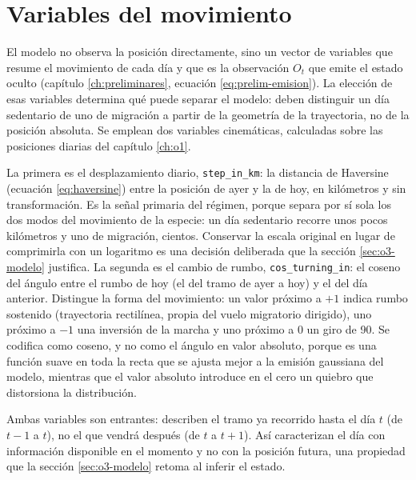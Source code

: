 \section{Variables del movimiento}
\label{sec:o3-features}

El modelo no observa la posición directamente, sino un vector de variables que resume
el movimiento de cada día y que es la observación $O_t$ que emite el estado oculto
(capítulo \ref{ch:preliminares}, ecuación \ref{eq:prelim-emision}). La elección de esas
variables determina qué puede separar el modelo: deben distinguir un día sedentario de
uno de migración a partir de la geometría de la trayectoria, no de la posición
absoluta. Se emplean dos variables cinemáticas, calculadas sobre las posiciones diarias
del capítulo \ref{ch:o1}.

La primera es el desplazamiento diario, \texttt{step\_in\_km}: la distancia de
Haversine (ecuación \ref{eq:haversine}) entre la posición de ayer y la de hoy, en
kilómetros y sin transformación. Es la señal primaria del régimen, porque separa por
sí sola los dos modos del movimiento de la especie: un día sedentario recorre unos
pocos kilómetros y uno de migración, cientos. Conservar la escala original en lugar de
comprimirla con un logaritmo es una decisión deliberada que la sección
\ref{sec:o3-modelo} justifica. La segunda es el cambio de rumbo,
\texttt{cos\_turning\_in}: el coseno del ángulo entre el rumbo de hoy (el del tramo de
ayer a hoy) y el del día anterior. Distingue la forma del movimiento: un valor próximo
a $+1$ indica rumbo sostenido (trayectoria rectilínea, propia del vuelo migratorio
dirigido), uno próximo a $-1$ una inversión de la marcha y uno próximo a $0$ un giro de
90\textdegree. Se codifica como coseno, y no como el ángulo en valor absoluto, porque
es una función suave en toda la recta que se ajusta mejor a la emisión gaussiana del
modelo, mientras que el valor absoluto introduce en el cero un quiebro que distorsiona
la distribución.

Ambas variables son entrantes: describen el tramo ya recorrido hasta el día $t$ (de
$t-1$ a $t$), no el que vendrá después (de $t$ a $t+1$). Así caracterizan el día con
información disponible en el momento y no con la posición futura, una propiedad que la
sección \ref{sec:o3-modelo} retoma al inferir el estado.

